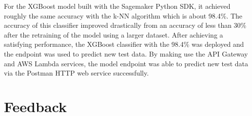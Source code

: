 For the XGBoost model built with the Sagemaker Python SDK, it achieved roughly the same accuracy with the k-NN algorithm which is about 98.4\%. The accuracy of this classifier improved drastically from an accuracy of less than 30\% after the retraining of the model using a larger dataset. After achieving a satisfying performance, the XGBoost classifier with the 98.4\% was deployed and the endpoint was used to predict new test data. By making use the API Gateway and AWS Lambda services, the model endpoint was able to predict new test data via the Postman HTTP web service successfully. 

\section{Feedback}

